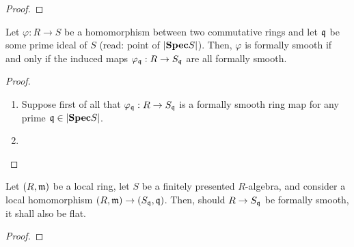                 \begin{proposition}
                    
                \end{proposition}
                    \begin{proof}
                        
                    \end{proof}
                    
                \begin{proposition} \label{prop: formal_smoothness_is_local}
                    Let $\varphi: R \to S$ be a homomorphism between two commutative rings and let $\mathfrak{q}$ be some prime ideal of $S$ (read: point of $|\mathbf{Spec} S|$). Then, $\varphi$ is formally smooth if and only if the induced maps $\varphi_{\mathfrak{q}}: R \to S_{\mathfrak{q}}$ are all formally smooth. 
                \end{proposition}
                    \begin{proof}
                        \noindent
                        \begin{enumerate}
                            \item Suppose first of all that $\varphi_{\mathfrak{q}}: R \to S_{\mathfrak{q}}$ is a formally smooth ring map for any prime $\mathfrak{q} \in |\mathbf{Spec} S|$.  
                            \item 
                        \end{enumerate}
                    \end{proof}
                    
                \begin{proposition}[Formally smooth + finite type + local = flat] \label{prop: formally_smooth_finite_type_local_morphisms_are_flat}
                    Let $(R, \mathfrak{m})$ be a local ring, let $S$ be a finitely presented $R$-algebra, and consider a local homomorphism $(R, \mathfrak{m}) \to (S_{\mathfrak{q}}, \mathfrak{q})$. Then, should $R \to S_{\mathfrak{q}}$ be formally smooth, it shall also be flat. 
                \end{proposition}
                    \begin{proof}
                        
                    \end{proof}
        
